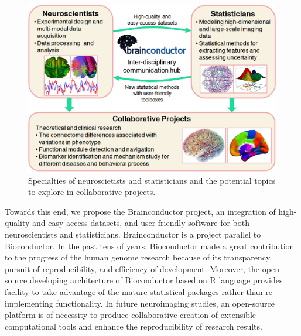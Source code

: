 \documentclass{nature}
\begin{document}
\begin{figure}[tb]
\centering
\includegraphics[width=400pt]{fig/brainconductor/Brainconductor_overview.png}
\caption{Specialties of neuroscietists and statisticians and the potential
topics to explore in collaborative projects.}
\label{fig:overview}
\end{figure}

Towards this end, we propose the Brainconductor project, an integration of
high-quality and easy-access datasets, and user-friendly software for both
neuroscientists and statisticians. Brainconductor is a project parallel to
Bioconductor. In the past tens of years,
Bioconductor\cite{gentleman2004bioconductor} made a great contribution to the
progress of
the human genome research because of its transparency, pursuit of
reproducibility, and efficiency of development. Moreover, the open-source
developing architecture of Bioconductor based on R language provides facility to
take advantage of the mature statistical packages rather than re-implementing
functionality. In future neuroimaging studies, an open-source platform is of
necessity to produce collaborative creation of extensible computational tools
and enhance the reproducibility of research results.
\end{document}
